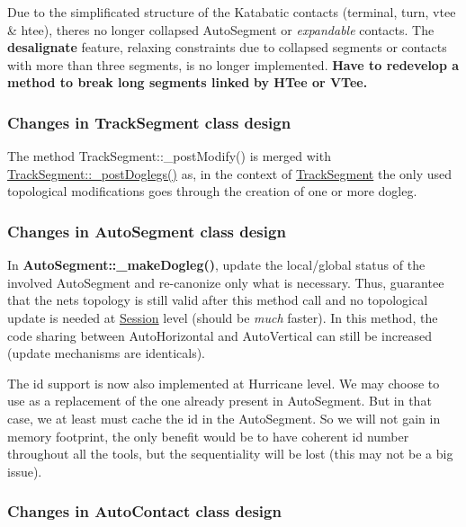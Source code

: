\begin{DoxyItemize}
\item Due to the simplificated structure of the Katabatic contacts (terminal, turn, vtee \& htee), there\textquotesingle{}s no longer collapsed Auto\+Segment or {\itshape expandable} contacts. The {\bfseries desalignate} feature, relaxing constraints due to collapsed segments or contacts with more than three segments, is no longer implemented. {\bfseries Have to redevelop a method to break long segments linked} {\bfseries by H\+Tee or V\+Tee.}
\end{DoxyItemize}\hypertarget{pageNotes_ssecModificationsTrackSegment}{}\subsubsection{Changes in Track\+Segment class design}\label{pageNotes_ssecModificationsTrackSegment}

\begin{DoxyItemize}
\item The method {\ttfamily Track\+Segment\+::\+\_\+post\+Modify()} is merged with \hyperlink{classKite_1_1TrackSegment_a10a45c049d0bd7d01c7eff1c5441c7a2}{Track\+Segment\+::\+\_\+post\+Doglegs()} as, in the context of \hyperlink{classKite_1_1TrackSegment}{Track\+Segment} the only used topological modifications goes through the creation of one or more dogleg.
\end{DoxyItemize}\hypertarget{pageNotes_ssecModificationsAutoSegment}{}\subsubsection{Changes in Auto\+Segment class design}\label{pageNotes_ssecModificationsAutoSegment}

\begin{DoxyItemize}
\item In \textbf{ Auto\+Segment\+::\+\_\+make\+Dogleg()}, update the local/global status of the involved Auto\+Segment and re-\/canonize only what is necessary. Thus, guarantee that the net\textquotesingle{}s topology is still valid after this method call and no topological update is needed at \hyperlink{classKite_1_1Session}{Session} level (should be {\itshape much} faster). In this method, the code sharing between Auto\+Horizontal and Auto\+Vertical can still be increased (update mechanisms are identicals).
\item The {\ttfamily id} support is now also implemented at Hurricane level. We may choose to use as a replacement of the one already present in Auto\+Segment. But in that case, we at least must cache the id in the Auto\+Segment. So we will not gain in memory footprint, the only benefit would be to have coherent id number throughout all the tools, but the sequentiality will be lost (this may not be a big issue).
\end{DoxyItemize}\hypertarget{pageNotes_ssecModificationsAutoContact}{}\subsubsection{Changes in Auto\+Contact class design}\label{pageNotes_ssecModificationsAutoContact}

